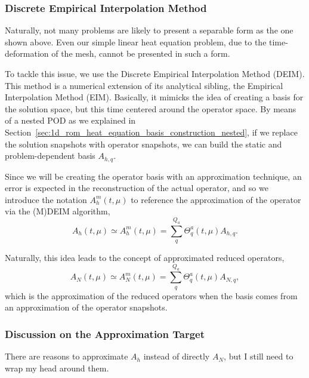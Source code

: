 \documentclass[../../1_heat_equation.tex]{subfiles}
\begin{document}
\subsubsection{Discrete Empirical Interpolation Method}
Naturally, not many problems are likely to present a separable form as the one shown above.
Even our simple linear heat equation problem, due to the time-deformation of the mesh, cannot be presented in such a form. 

To tackle this issue, we use the Discrete Empirical Interpolation Method (DEIM).
This method is a numerical extension of its analytical sibling, the Empirical Interpolation Method (EIM).
Basically, it mimicks the idea of creating a basis for the solution space, but this time centered around the operator space.
By means of a nested POD as we explained in Section~\ref{sec:1d_rom_heat_equation_basis_construction_nested}, if we replace the solution snapshots with operator snapshots, we can build the static and problem-dependent basis $A_{h,q}$.

Since we will be creating the operator basis with an approximation technique, an error is expected in the reconstruction of the actual operator, and so we introduce the notation $A_h^m(t, \mu)$ to reference the approximation of the operator via the (M)DEIM algorithm,
\begin{equation}
    \label{eq:1d_rom_heat_equation_system_approximation}
    A_h(t, \mu) \simeq A_h^m(t, \mu) = \sum_q^{Q_a} \Theta_q^a(t, \mu) A_{h,q}.
\end{equation}

Naturally, this idea leads to the concept of approximated reduced operators,
\begin{equation}
    A_N(t, \mu) \simeq A_N^m(t, \mu) = \sum_q^{Q_a} \Theta_q^a(t, \mu) A_{N,q},
\end{equation}
which is the approximation of the reduced operators when the basis comes from an approximation of the operator snapshots. 

\subsubsection{Discussion on the Approximation Target}
There are reasons to approximate $A_h$ instead of directly $A_N$, but I still need to wrap my head around them. 
\end{document}
